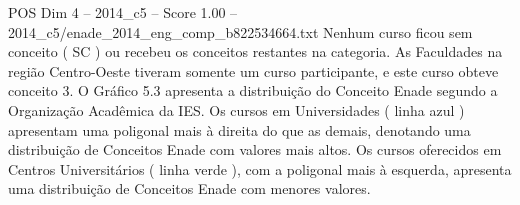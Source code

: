 \begin{textsample}{POS Dim 4 – 2014\_c5 – Score 1.00 – 2014\_c5/enade\_2014\_eng\_comp\_b822534664.txt}
Nenhum curso ficou sem conceito ( SC ) ou recebeu os conceitos restantes na categoria.
As Faculdades na região Centro-Oeste tiveram somente um curso participante, e este curso obteve conceito 3.
O Gráfico 5.3 apresenta a distribuição do Conceito Enade segundo a Organização Acadêmica da IES.
Os cursos em Universidades ( linha azul ) apresentam uma poligonal mais à direita do que as demais, denotando uma distribuição de Conceitos Enade com valores mais altos.
Os cursos oferecidos em Centros Universitários ( linha verde ), com a poligonal mais à esquerda, apresenta uma distribuição de Conceitos Enade com menores valores.

\end{textsample}
